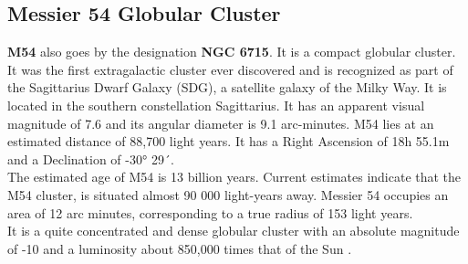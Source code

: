 \documentclass[12pt]{article}
\begin{document}
		\subsection{Messier 54 Globular Cluster}
		\textbf{M54} also goes by the designation \textbf{NGC 6715}. It is a compact globular cluster.\\
		It was the first extragalactic cluster ever discovered and is recognized as part of the Sagittarius Dwarf Galaxy (SDG), a satellite galaxy of the Milky Way\cite{nasa_m54}. It is located in the southern constellation Sagittarius. It has an apparent visual magnitude of 7.6 and its angular diameter is 9.1 arc-minutes. M54 lies at an estimated distance of 88,700 light years. It has a Right Ascension of 18h 55.1m and a Declination of -30° 29´.\\
		The estimated age of M54 is 13 billion years. Current estimates indicate that the M54 cluster, is situated almost 90 000 light-years away. Messier 54 occupies an area of 12 arc minutes, corresponding to a true radius of 153 light years.\\
		It is a quite concentrated and dense globular cluster with an absolute magnitude of -10 and a luminosity about 850,000 times that of the Sun \cite{messier54}.
\end{document}
